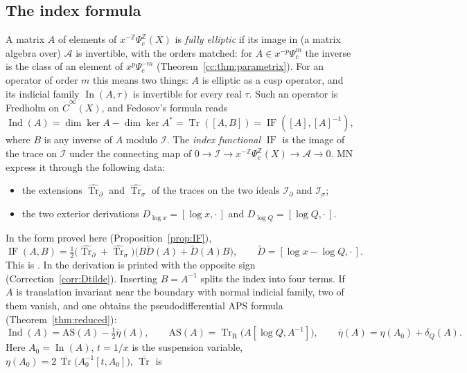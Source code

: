 \documentclass[11pt,oneside,reqno]{article}
\DeclareMathOperator{\Tr}{Tr}
\DeclareMathOperator{\Ind}{Ind}
\DeclareMathOperator{\IF}{IF}
\DeclareMathOperator{\In}{In}
\newcommand{\Z}{\mathbb Z}
\newcommand{\cA}{\mathcal A}
\newcommand{\cI}{\mathcal I}
\newcommand{\Is}{\mathcal I_\sigma}
\newcommand{\Id}{\mathcal I_\partial}
\newcommand{\Psic}{\Psi_{c}}
\newcommand{\hTrs}{\widehat{\Tr}_\sigma}
\newcommand{\hTrd}{\widehat{\Tr}_\partial}
\newcommand{\bTr}{\overline{\Tr}}
\newcommand{\TrR}{\Tr_{\mathrm R}}
\newcommand{\dCI}{\dot C^\infty}
\newcommand{\lQ}{\log Q}
\newcommand{\lx}{\log x}
\newcommand{\AS}{\mathrm{AS}}
\newcommand{\etab}{\overline\eta}
\theoremstyle{plain}
\theoremstyle{definition}
\theoremstyle{remark}
\begin{document}
\subsection{The index formula}\label{subsec:indexintro}
A matrix \(A\) of elements of \(x^{-\Z}\Psic^{\Z}(X)\) is \emph{fully
elliptic} if its image in (a matrix algebra over) \(\cA\) is invertible,
with the orders matched: for \(A\in x^{-p}\Psic^m\) the inverse is the
class of an element of \(x^p\Psic^{-m}\) (Theorem~\ref{cc:thm:parametrix}).
For an operator of order \(m\) this means two things: \(A\) is elliptic as
a cusp operator, and its indicial family \(\In(A,\tau)\) is invertible for
every real \(\tau\). Such an operator is Fredholm on \(\dCI(X)\), and
Fedosov's formula reads \cite[(7)]{MN}
\begin{equation}\label{eq:fedosovintro}
 \Ind(A)=\dim\ker A-\dim\ker A^*=\Tr([A,B])=\IF([A],[A]^{-1}),
\end{equation}
where \(B\) is any inverse of \(A\) modulo \(\cI\). The \emph{index
functional} \(\IF\) is the image of the trace on \(\cI\) under the
connecting map of \(0\to\cI\to x^{-\Z}\Psic^{\Z}(X)\to\cA\to0\). MN
express it through the following data:
\begin{itemize}
\item the extensions \(\hTrd\) and \(\hTrs\) of the traces on the two
ideals \(\Id\) and \(\Is\);
\item the two exterior derivations \(D_{\lx}=[\lx,\cdot\,]\) and
\(D_{\lQ}=[\lQ,\cdot\,]\).
\end{itemize}
In the form proved here (Proposition~\ref{prop:IF}),
\begin{equation}\label{eq:IFintro}
 \IF(A,B)=\tfrac12\bigl(\hTrd+\hTrs\bigr)\bigl(B\widetilde D(A)+
 \widetilde D(A)B\bigr),\qquad \widetilde D=[\lx-\lQ,\cdot\,].
\end{equation}
This is \cite[(87)]{MN}. In \cite[(21)]{MN} the derivation is printed with
the opposite sign (Correction~\ref{corr:Dtilde}). Inserting \(B=A^{-1}\)
splits the index into four terms. If \(A\) is translation invariant near the
boundary with normal indicial family, two of them vanish, and one obtains
the pseudodifferential APS formula (Theorem~\ref{thm:reduced}):
\begin{equation}\label{eq:reducedintro}
 \Ind(A)=\AS(A)-\tfrac12\etab(A),\qquad
 \AS(A)=\TrR\bigl(A[\lQ,A^{-1}]\bigr),\qquad
 \etab(A)=\eta(A_0)+\delta_Q(A).
\end{equation}
Here \(A_0=\In(A)\), \(t=1/x\) is the suspension variable,
\(\eta(A_0)=2\,\bTr\bigl(A_0^{-1}[t,A_0]\bigr)\), \(\bTr\) is
\end{document}

